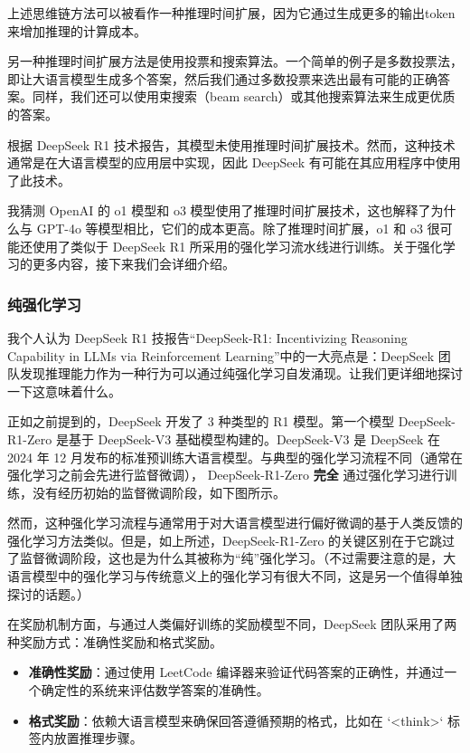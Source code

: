 \documentclass[lang=cn,newtx,10pt,scheme=chinese]{elegantbook}
\begin{document}
上述思维链方法可以被看作一种推理时间扩展，因为它通过生成更多的输出token来增加推理的计算成本。

另一种推理时间扩展方法是使用投票和搜索算法。一个简单的例子是多数投票法，即让大语言模型生成多个答案，然后我们通过多数投票来选出最有可能的正确答案。同样，我们还可以使用束搜索（beam search）或其他搜索算法来生成更优质的答案。

根据 DeepSeek R1 技术报告，其模型未使用推理时间扩展技术。然而，这种技术通常是在大语言模型的应用层中实现，因此 DeepSeek 有可能在其应用程序中使用了此技术。

我猜测 OpenAI 的 o1 模型和 o3 模型使用了推理时间扩展技术，这也解释了为什么与 GPT-4o 等模型相比，它们的成本更高。除了推理时间扩展，o1 和 o3 很可能还使用了类似于 DeepSeek R1 所采用的强化学习流水线进行训练。关于强化学习的更多内容，接下来我们会详细介绍。

\subsubsection{纯强化学习}

我个人认为 DeepSeek R1 技报告``DeepSeek-R1: Incentivizing Reasoning Capability in LLMs via Reinforcement Learning''中的一大亮点是：DeepSeek 团队发现推理能力作为一种行为可以通过纯强化学习自发涌现。让我们更详细地探讨一下这意味着什么。

正如之前提到的，DeepSeek 开发了 3 种类型的 R1 模型。第一个模型 DeepSeek-R1-Zero 是基于 DeepSeek-V3 基础模型构建的。DeepSeek-V3 是 DeepSeek 在 2024 年 12 月发布的标准预训练大语言模型。与典型的强化学习流程不同（通常在强化学习之前会先进行监督微调）， DeepSeek-R1-Zero \textbf{完全} 通过强化学习进行训练，没有经历初始的监督微调阶段，如下图所示。

然而，这种强化学习流程与通常用于对大语言模型进行偏好微调的基于人类反馈的强化学习方法类似。但是，如上所述，DeepSeek-R1-Zero 的关键区别在于它跳过了监督微调阶段，这也是为什么其被称为``纯''强化学习。（不过需要注意的是，大语言模型中的强化学习与传统意义上的强化学习有很大不同，这是另一个值得单独探讨的话题。）

在奖励机制方面，与通过人类偏好训练的奖励模型不同，DeepSeek 团队采用了两种奖励方式：准确性奖励和格式奖励。

\begin{itemize}
\item \textbf{准确性奖励}：通过使用 LeetCode 编译器来验证代码答案的正确性，并通过一个确定性的系统来评估数学答案的准确性。
\item \textbf{格式奖励}：依赖大语言模型来确保回答遵循预期的格式，比如在 `<think>` 标签内放置推理步骤。
\end{itemize}
\end{document}
